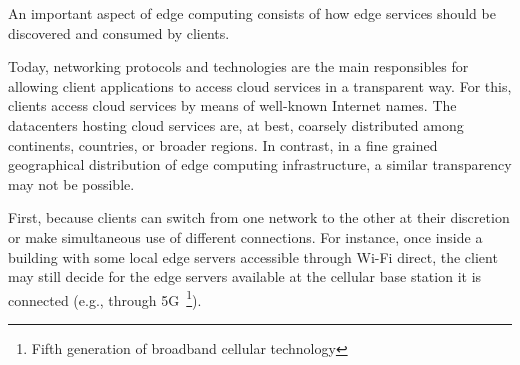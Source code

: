An important aspect of edge computing consists of how edge services should be discovered and consumed by clients. 

Today, networking protocols and technologies are the main responsibles for allowing client applications to access cloud services in a transparent way. For this, clients access cloud services by means of well-known Internet names. The datacenters hosting cloud services are, at best, coarsely distributed among continents, countries, or broader regions. 
In contrast, in a fine grained geographical distribution of edge computing infrastructure, a similar transparency may not be possible. 

%
%
%

First, because clients can switch from one network to the other at their discretion or make simultaneous use of different connections. For instance, once inside a building with some local edge servers accessible through Wi-Fi direct, the client may still decide for the edge servers available at the cellular base station it is connected (e.g., through 5G~\footnote{Fifth generation of broadband cellular technology}). 

